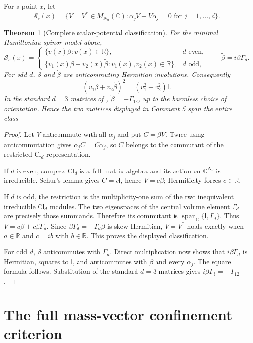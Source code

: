 \documentclass[11pt]{article}
\newtheorem{theorem}{Theorem}
\newcommand{\C}{\mathbb C}
\newcommand{\R}{\mathbb R}
\newcommand{\Id}{\mathsf I}
\newcommand{\op}{\operatorname}
\begin{document}
For a point $x$, let
\[
 \mathcal S_s(x)=\{V=V^*\in M_{N_d}(\C):
       \alpha_jV+V\alpha_j=0\text{ for }j=1,\dots,d\}.
\]

\begin{theorem}[Complete scalar-potential classification]\label{thm:class}
For the minimal Hamiltonian spinor model above,
\[
 \mathcal S_s(x)=
 \begin{cases}
   \{v(x)\beta:v(x)\in\R\},& d\text{ even},\\[2mm]
   \{v_1(x)\beta+v_2(x)\widetilde\beta:
             v_1(x),v_2(x)\in\R\},&d\text{ odd},
 \end{cases}
 \qquad \widetilde\beta=i\beta\Gamma_d.
\]
For odd $d$, $\beta$ and $\widetilde\beta$ are anticommuting Hermitian
involutions.  Consequently
\[
 (v_1\beta+v_2\widetilde\beta)^2=(v_1^2+v_2^2)\Id.
\]
In the standard $d=3$ matrices of \cite{NNO},
$\widetilde\beta=-\Gamma_{12}$, up to the harmless choice of orientation.
Hence the two matrices displayed in Comment 5 span the entire class.
\end{theorem}

\begin{proof}
Let $V$ anticommute with all $\alpha_j$ and put $C=\beta V$.  Twice using
anticommutation gives $\alpha_jC=C\alpha_j$, so $C$ belongs to the commutant of
the restricted $\mathrm{Cl}_d$ representation.

If $d$ is even, complex $\mathrm{Cl}_d$ is a full matrix algebra and its action
on $\C^{N_d}$ is irreducible.  Schur's lemma gives $C=c\Id$, hence
$V=c\beta$; Hermiticity forces $c\in\R$.

If $d$ is odd, the restriction is the multiplicity-one sum of the two
inequivalent irreducible $\mathrm{Cl}_d$ modules.  The two eigenspaces of the
central volume element $\Gamma_d$ are precisely those summands.  Therefore its
commutant is $\op{span}_{\C}\{\Id,\Gamma_d\}$.  Thus
$V=a\beta+c\beta\Gamma_d$.  Since $\beta\Gamma_d=-\Gamma_d\beta$ is
skew-Hermitian, $V=V^*$ holds exactly when $a\in\R$ and $c=ib$ with
$b\in\R$.  This proves the displayed classification.

For odd $d$, $\beta$ anticommutes with $\Gamma_d$.  Direct multiplication now
shows that $i\beta\Gamma_d$ is Hermitian, squares to $\Id$, and anticommutes
with $\beta$ and every $\alpha_j$.  The square formula follows.  Substitution
of the standard $d=3$ matrices gives $i\beta\Gamma_3=-\Gamma_{12}$.
\end{proof}

\section{The full mass-vector confinement criterion}
\end{document}
